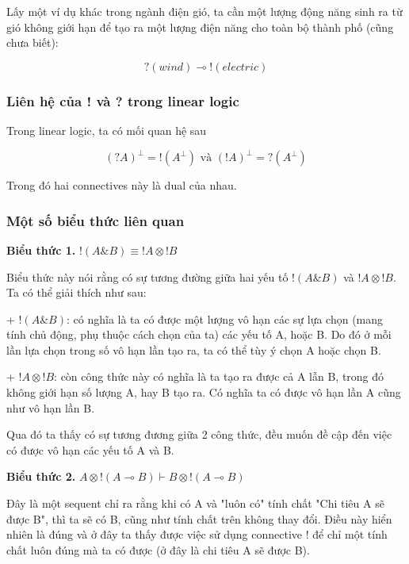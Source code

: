 Lấy một ví dụ khác trong ngành điện gió, ta cần một lượng động năng sinh ra từ gió không giới hạn để tạo ra một lượng điện năng cho toàn bộ thành phố (cũng chưa biết):

$$ ?(wind) \multimap  !(electric) $$

\subsubsection{Liên hệ của ! và ? trong linear logic}
Trong linear logic, ta có mối quan hệ sau

$$ (?A)^{\bot} = !(A^{\bot}) \text{   và   } (!A)^{\bot} = ?(A^{\bot}) $$

Trong đó hai connectives này là dual của nhau.

\subsubsection{Một số biểu thức liên quan}

\vspace{0.4cm}
\textbf{Biểu thức 1.} $ !(A\&B) \equiv !A \otimes !B $
\vspace{0.4cm}

Biểu thức này nói rằng có sự tương đường giữa hai yếu tố $ !(A\&B) $ và $ !A \otimes !B $. Ta có thể giải thích như sau:

+ $ !(A\&B) $: có nghĩa là ta có được một lượng vô hạn các sự lựa chọn (mang tính chủ động, phụ thuộc cách chọn của ta) các yếu tố A, hoặc B. Do đó ở mỗi lần lựa chọn trong số vô hạn lần tạo ra, ta có thể tùy ý chọn A hoặc chọn B.

+ $ !A \otimes !B  $: còn công thức này có nghĩa là ta tạo ra được cả A lẫn B, trong đó không giới hạn số lượng A, hay B tạo ra. Có nghĩa ta có được vô hạn lần A cũng như vô hạn lần B.

Qua đó ta thấy có sự tương đương giữa 2 công thức, đều muốn đề cập đến việc có được vô hạn các yếu tố A và B. 


\vspace{0.5cm}
\textbf{Biểu thức 2.} \textbf{$ A \otimes !(A \multimap B) \vdash B \otimes !(A \multimap B) $}
\vspace{0.4cm}

Đây là một sequent chỉ ra rằng khi có A và "luôn có" tính chất "Chi tiêu A sẽ được B", thì ta sẽ có B, cũng như tính chất trên không thay đổi. Điều này hiển nhiên là đúng và ở đây ta thấy được việc sử dụng connective ! để chỉ một tính chất luôn đúng mà ta có được (ở đây là chi tiêu A sẽ được B).